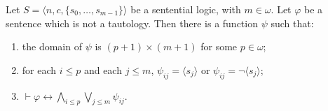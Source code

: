 Let $S = \langle n, c, \{s_0, \ldots, s_{m-1}\} \rangle$ be a sentential logic, with $m \in \omega$. Let $\varphi$ be a sentence which is not a tautology. Then there is a function $\psi$ such that:

\begin{enumerate}
\item[(i)] the domain of $\psi$ is $(p + 1) \times (m + 1)$ for some $p \in \omega$;
\item[(ii)] for each $i \leq p$ and each $j \leq m$, $\psi_{ij} = \langle s_j \rangle$ or $\psi_{ij} = \neg \langle s_j \rangle$;
\item[(iii)] $\vdash \varphi \leftrightarrow \bigwedge_{i \leq p} \bigvee_{j \leq m} \psi_{ij}$.
\end{enumerate}
